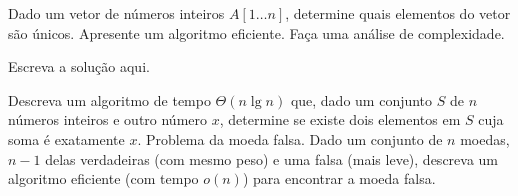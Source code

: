 \documentclass[a4paper]{exam}
\begin{document}
\begin{questions}
  \question Dado um vetor de números inteiros $A[1 \ldots n]$, determine
  quais elementos do vetor são únicos. Apresente um algoritmo eficiente.
  Faça uma análise de complexidade.
  \begin{solution}
    Escreva a solução aqui.
  \end{solution}
  \question Descreva um algoritmo de tempo $\Theta(n \lg n)$ que, dado
  um conjunto $S$ de $n$ números inteiros e outro número $x$, determine
  se existe dois elementos em $S$ cuja soma é exatamente $x$.
  \question Problema da moeda falsa. Dado um conjunto de $n$ moedas,
  $n-1$ delas verdadeiras (com mesmo peso) e uma falsa (mais leve),
  descreva um algoritmo eficiente (com tempo $o(n)$) para encontrar
  a moeda falsa. 
\end{questions}
\end{document}
